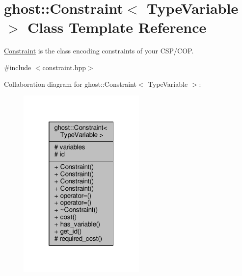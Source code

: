 \hypertarget{classghost_1_1Constraint}{\section{ghost\-:\-:Constraint$<$ Type\-Variable $>$ Class Template Reference}
\label{classghost_1_1Constraint}
}


\hyperlink{classghost_1_1Constraint}{Constraint} is the class encoding constraints of your C\-S\-P/\-C\-O\-P.  




{\ttfamily \#include $<$constraint.\-hpp$>$}



Collaboration diagram for ghost\-:\-:Constraint$<$ Type\-Variable $>$\-:
\nopagebreak
\begin{figure}[H]
\begin{center}
\leavevmode
\includegraphics[width=176pt]{classghost_1_1Constraint__coll__graph}
\end{center}
\end{figure}
